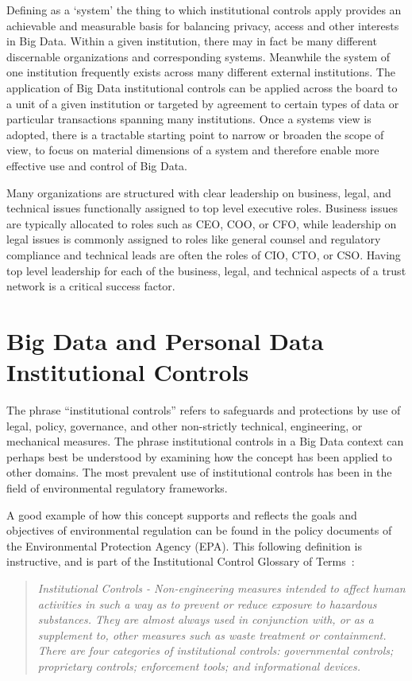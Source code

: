Defining as a `system' the thing to which institutional controls apply provides an achievable and measurable basis for balancing privacy, access and other interests in Big Data.  Within a given institution, there may in fact be many different discernable organizations and corresponding systems.  Meanwhile the system of one institution frequently exists across many different external institutions.  The application of Big Data institutional controls can be applied across the board to a unit of a given institution or targeted by agreement to certain types of data or particular transactions spanning many institutions. Once a systems view is adopted, there is a tractable starting point to narrow or broaden the scope of view, to focus on material dimensions of a system and therefore enable more effective use and control of Big Data.


Many organizations are structured with clear leadership on business, legal, and technical issues functionally assigned to top level executive roles.  Business issues are typically allocated to roles such as CEO, COO, or CFO, while leadership on legal issues is commonly assigned to roles like general counsel and regulatory compliance and technical leads are often the roles of CIO, CTO, or CSO. Having top level leadership for each of the business, legal, and technical aspects of a trust network is a critical success factor. 


\section{Big Data and Personal Data Institutional Controls }

The phrase ``institutional controls'' refers to safeguards and protections by use of legal, policy, governance, and other non-strictly technical, engineering, or mechanical measures.
The phrase institutional controls in a Big Data context can perhaps best be understood by examining how the concept has been applied to other domains.
The most prevalent use of institutional controls has been in the field of environmental regulatory frameworks.

A good example of how this concept supports and reflects the goals and objectives of environmental regulation can be found in the policy documents of the Environmental Protection Agency (EPA).
This following definition is instructive, and is part of the Institutional Control Glossary of Terms~\cite{EPA2007}:
\begin{quote}
\emph{
Institutional Controls - Non-engineering measures intended to affect human activities in such a way as to prevent or reduce exposure to hazardous substances. They are almost always used in conjunction with, or as a supplement to, other measures such as waste treatment or containment. There are four categories of institutional controls: governmental controls; proprietary controls; enforcement tools; and informational devices.
}
\end{quote}

